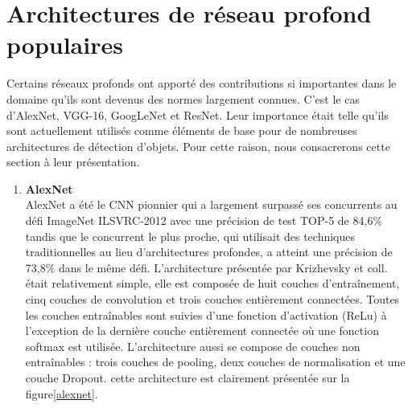 \section{Architectures de réseau profond populaires} 
Certains réseaux profonds ont apporté des contributions si importantes dans le domaine qu'ils sont devenus des normes largement connues. C'est le cas d'AlexNet, VGG-16, GoogLeNet et ResNet. Leur importance était telle qu'ils sont actuellement utilisés comme éléments de base pour de nombreuses architectures de détection d'objets. Pour cette raison, nous consacrerons cette section à leur présentation. 

\begin{enumerate}
\item \textbf{AlexNet}\cite{alexnet}\\
AlexNet a été le  CNN pionnier qui a largement surpassé ses concurrents au défi ImageNet ILSVRC-2012 avec une précision de test TOP-5 de 84,6\% tandis que le concurrent le plus proche, qui utilisait des techniques traditionnelles au lieu d'architectures profondes, a atteint une précision de 73,8\% dans le même défi. L'architecture présentée par Krizhevsky et coll. était relativement simple, elle est composée de huit couches d'entraînement, cinq couches de convolution et trois couches entièrement connectées. Toutes les couches entraînables sont suivies d'une fonction d'activation (ReLu) à l'exception de la dernière couche entièrement connectée où une fonction softmax est utilisée. L'architecture aussi se compose de couches
non entraînables : trois couches de pooling, deux couches de normalisation et une couche Dropout. cette architecture est clairement présentée sur la figure\ref{alexnet}.


\end{enumerate}
